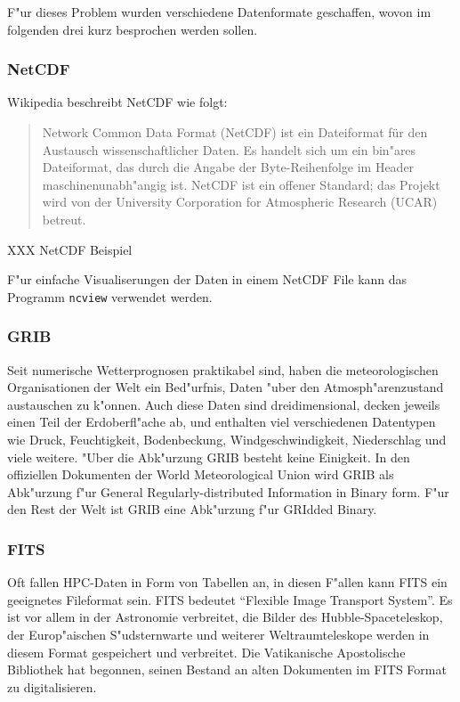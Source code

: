 F"ur dieses Problem wurden verschiedene Datenformate geschaffen, 
wovon im folgenden drei kurz besprochen werden sollen.

\subsubsection{NetCDF}
Wikipedia beschreibt NetCDF wie folgt:
\begin{quote}
Network Common Data Format (NetCDF) ist ein Dateiformat für den
Austausch wissenschaftlicher Daten. Es handelt sich um ein bin"ares
Dateiformat, das durch die Angabe der Byte-Reihenfolge im Header
maschinenunabh"angig ist. NetCDF ist ein offener Standard; das Projekt
wird von der University Corporation for Atmospheric Research (UCAR)
betreut.
\end{quote}

XXX NetCDF Beispiel 

F"ur einfache Visualiserungen der Daten in einem NetCDF File kann
das Programm {\tt ncview} verwendet werden.

\subsubsection{GRIB}
Seit numerische Wetterprognosen praktikabel sind, haben
die meteorologischen Organisationen der Welt ein Bed"urfnis,
Daten "uber den Atmosph"arenzustand austauschen zu k"onnen.
Auch diese Daten sind dreidimensional, decken jeweils einen Teil
der Erdoberfl"ache ab, und enthalten viel verschiedenen Datentypen
wie Druck, Feuchtigkeit, Bodenbeckung, Windgeschwindigkeit, Niederschlag
und viele weitere.
"Uber die Abk"urzung GRIB besteht keine Einigkeit.
In den offiziellen Dokumenten der World Meteorological Union wird GRIB
als Abk"urzung f"ur
General Regularly-distributed Information in Binary form. 
F"ur den Rest der Welt ist GRIB eine Abk"urzung f"ur GRIdded Binary.

\subsubsection{FITS}
Oft fallen HPC-Daten in Form von Tabellen an, in diesen F"allen
kann FITS ein geeignetes Fileformat sein. FITS bedeutet ``Flexible
Image Transport System''.
Es ist vor allem in der Astronomie verbreitet, die Bilder des
Hubble-Spaceteleskop, der Europ"aischen S"udsternwarte und weiterer
Weltraumteleskope werden in diesem Format gespeichert und verbreitet.
Die Vatikanische Apostolische Bibliothek hat begonnen, seinen Bestand
an alten Dokumenten im FITS Format zu digitalisieren.

